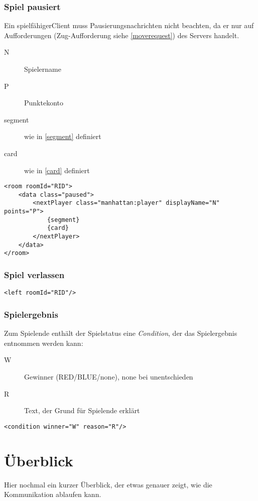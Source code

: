 \documentclass[12pt,a4paper, german, oneside]{scrartcl}
\begin{document}
\section{Spiel pausiert}
Ein \glqq spielfähiger\grqq Client muss Pausierungsnachrichten nicht beachten, da er nur auf Aufforderungen (Zug-Aufforderung siehe \ref{moverequest}) des Servers handelt.
\begin{description}
\item[N] Spielername
\item[P] Punktekonto
\item[segment] wie in \ref{segment} definiert
\item[card] wie in \ref{card} definiert
\end{description}
\begin{verbatim}
<room roomId="RID">
	<data class="paused">
		<nextPlayer class="manhattan:player" displayName="N" points="P">
			{segment}
			{card}
		</nextPlayer>
	</data>
</room>
\end{verbatim}

\section{Spiel verlassen}
\begin{verbatim}
<left roomId="RID"/>
\end{verbatim}


\section{\label{gameend}Spielergebnis}
Zum Spielende enthält der Spielstatus eine \textit{Condition}, der das Spielergebnis entnommen werden kann:
\begin{description}
\item[W] Gewinner (RED/BLUE/none), none bei unentschieden
\item[R] Text, der Grund für Spielende erklärt
\end{description}
\begin{verbatim}
<condition winner="W" reason="R"/>
\end{verbatim}

\newpage
\part{Überblick}
Hier nochmal ein kurzer Überblick, der etwas genauer zeigt, wie die Kommunikation ablaufen kann.\bigskip\\
\end{document}
